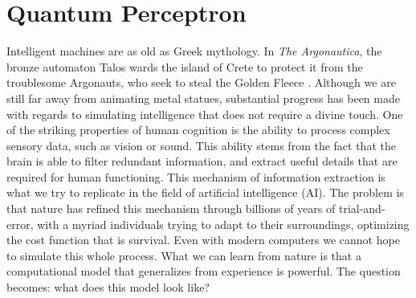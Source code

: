 \chapter{Quantum Perceptron}

Intelligent machines are as old as Greek mythology. In \textit{The Argonautica}, the bronze automaton Talos wards the island of Crete to protect it from the troublesome Argonauts, who seek to steal the Golden Fleece \cite{Seaton1912}. Although we are still far away from animating metal statues, substantial progress has been made with regards to simulating intelligence that does not require a divine touch. One of the striking properties of human cognition is the ability to process complex sensory data, such as vision or sound. This ability stems from the fact that the brain is able to filter redundant information, and extract useful details that are required for human functioning. This mechanism of information extraction is what we try to replicate in the field of artificial intelligence (AI). The problem is that nature has refined this mechanism through billions of years of trial-and-error, with a myriad individuals trying to adapt to their surroundings, optimizing the cost function that is survival. Even with modern computers we cannot hope to simulate this whole process. What we can learn from nature is that a computational model that generalizes from experience is powerful. The question becomes: what does this model look like? \newline

